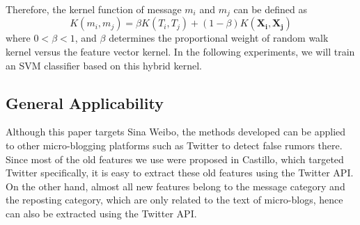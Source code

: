 Therefore, the kernel function of message $m_i$ and $m_j$ can be defined as
\begin{equation}
K(m_i, m_j) = \beta K(T_i,T_j) + (1-\beta) K(\boldsymbol{X_i},\boldsymbol{X_j})
\end{equation}
where $0<\beta<1$, and $\beta$ determines the proportional weight of
random walk kernel versus the feature vector kernel.
In the following experiments, we will train an SVM classifier
based on this hybrid kernel.

\subsection{General Applicability}
\label{sec:applicability}

Although this paper targets Sina Weibo, the methods developed can be 
applied to other micro-blogging platforms such as Twitter 
to detect false rumors there. Since most of the old features we use
were proposed in Castillo\cite{castillo2011information}, 
which targeted Twitter specifically, it is easy to extract these old 
features using the Twitter API. On the other hand, almost all new features 
belong to the message category and the reposting category, which are 
only related to the text of micro-blogs, hence can also be extracted 
using the Twitter API.

